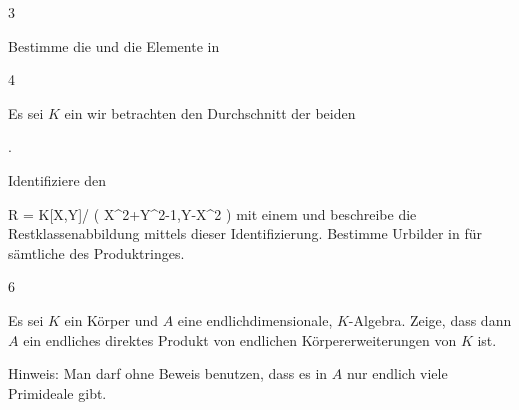 {3}
{





Bestimme die
und die
Elemente in





}
{} {}

{4}
{





Es sei $K$ ein
wir betrachten den Durchschnitt der beiden

 { . }

Identifiziere den

\mavergleichskettedisp
{\vergleichskette
{ R
}
{ =} { K[X,Y]/ \left(  X^2+Y^2-1,Y-X^2  \right)
}
{ } {
}
{ } {
}
{ } {
}
}
{}{}{}
mit einem
und beschreibe die Restklassenabbildung
 mittels dieser Identifizierung. Bestimme Urbilder in
 für sämtliche
des Produktringes.





}
{} {}

{6}
{





Es sei $K$ ein Körper und $A$ eine endlichdimensionale,
$K$-Algebra. Zeige, dass dann $A$ ein endliches direktes Produkt von endlichen Körpererweiterungen von $K$ ist.





}
{} {Hinweis: Man darf ohne Beweis benutzen, dass es in $A$ nur endlich viele Primideale gibt.}
